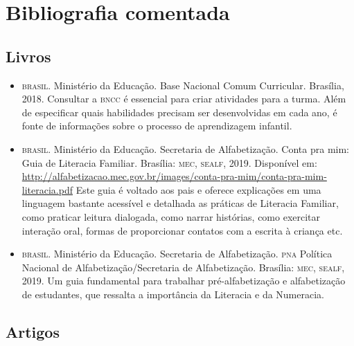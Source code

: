 \documentclass[11pt]{extarticle}
\begin{document}
\section{Bibliografia comentada}

\subsection{Livros}

\begin{itemize}
\item \textsc{brasil}. Ministério da Educação. Base Nacional Comum Curricular. Brasília, 2018.
Consultar a \textsc{bncc} é essencial para criar atividades para a turma. Além de especificar 
quais habilidades precisam ser desenvolvidas em cada ano, é fonte de informações sobre 
o processo de aprendizagem infantil. 

\item \textsc{brasil}. Ministério da Educação. Secretaria de Alfabetização. Conta pra mim: Guia de Literacia Familiar. 
Brasília: \textsc{mec, sealf}, 2019. Disponível em: \url{http://alfabetizacao.mec.gov.br/images/conta-pra-mim/conta-pra-mim-literacia.pdf}
Este guia é voltado aos pais e oferece explicações em uma linguagem bastante acessível e detalhada as práticas de Literacia Familiar, 
como praticar leitura dialogada, como narrar histórias, como exercitar interação oral, formas de proporcionar contatos com a escrita à criança etc. 
 
\item \textsc{brasil}. Ministério da Educação. Secretaria de Alfabetização. \textsc{pna} Política Nacional de Alfabetização/Secretaria 
de Alfabetização. Brasília: \textsc{mec, sealf}, 2019.
Um guia fundamental para trabalhar pré-alfabetização e alfabetização de estudantes, que ressalta a importância da Literacia e da Numeracia. 


\end{itemize}


\subsection{Artigos}
\end{document}
